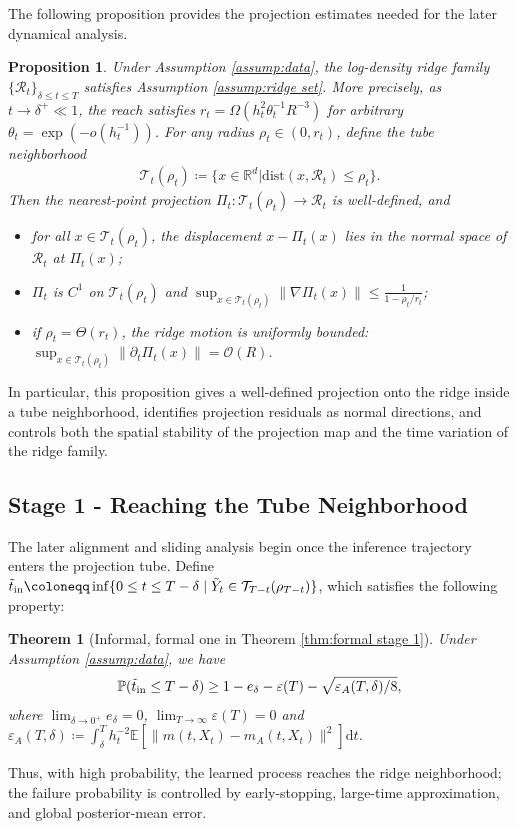 \documentclass[11pt]{article}
\newcommand{\mb}{\mathbb}
\newcommand{\dee}{\mathrm{d}}
\newcommand{\mc}{\mathcal}
\newtheorem{theorem}{Theorem}[section]
\newtheorem{proposition}{Proposition}[section]
\begin{document}
The following proposition provides the projection estimates needed for the later dynamical analysis.
\begin{proposition}\label{prop:projection-regularity} Under Assumption \ref{assump:data}, the log-density ridge family $\{\mc{R}_t\}_{\delta\le t\le T}$ satisfies Assumption \ref{assump:ridge set}. More precisely, as $t\to \delta^+\ll 1$, the reach satisfies $r_t = \Omega(h_t^{2} \theta_t^{-1} R^{-3})$ for arbitrary $\theta_t=\exp(- o(h_{t}^{-1}) )$. For any radius $\rho_t\in (0,r_t)$, define the tube neighborhood
   \begin{align}\label{eq:tube ridge}
    \mc{T}_t(\rho_t)\coloneqq \{ x\in \mb{R}^d | \mathrm{dist}(x, \mc{R}_t)\le \rho_t \}.
\end{align} 
Then the nearest-point projection $\Pi_t: \mc{T}_t(\rho_t)\to \mc{R}_t$ is well-defined, and
\begin{itemize}
    \item [(1)] for all $ x\in \mc{T}_t(\rho_t)$, the displacement $ x-\Pi_t(x)$ lies in the normal space of $\mc{R}_t$ at $\Pi_t(x)$;
    \item [(2)]  $\Pi_t$ is $C^1$ on $\mc{T}_t(\rho_t)$ and $\sup_{x\in \mc{T}_t(\rho_t)} \| \nabla \Pi_t(x) \|\le \tfrac{1}{1-\rho_t/r_t}$;
    \item [(3)] if $\rho_t=\Theta(r_t)$, the ridge motion is uniformly bounded: $\sup_{x\in \mc{T}_t(\rho_t)}\| \partial_t\Pi_t(x)\| = \mc{O}\left( R\right)$.
\end{itemize}
\end{proposition}
In particular, this proposition gives a well-defined projection onto the ridge inside a tube neighborhood, identifies projection residuals as normal directions, and controls both the spatial stability of the projection map and the time variation of the ridge family.
\subsection{Stage 1 - Reaching the Tube Neighborhood}
\label{sec:stage1}
The later alignment and sliding analysis begin once the inference trajectory enters the projection tube. Define $ \Tilde{t}_{\mathrm{in}}  \coloneqq \inf \{ 0\le t\le T-\delta \mid \Tilde{Y}_t\in \mc{T}_{T-t}(\rho_{T-t}) \}$, which satisfies the following property:
\begin{theorem}[Informal, formal one in Theorem \ref{thm:formal stage 1}]\label{thm:informal stage 1} Under Assumption \ref{assump:data}, we have
\begin{align*}
    \mb{P}(\Tilde{t}_{\mathrm{in}}\le T-\delta)\ge 1-e_\delta -\varepsilon(T)-\sqrt{\varepsilon_A(T,\delta)/8},
\end{align*}
where $\lim_{\delta\to 0^+} e_\delta = 0$, $\lim_{T\to\infty}\varepsilon(T)= 0$ and $\varepsilon_A(T,\delta)\coloneqq \int_\delta^T h_t^{-2}\mb{E}[ \| m(t,X_t)-m_A(t,X_t) \|^2 ]\dee t$. 
\end{theorem}
Thus, with high probability, the learned process reaches the ridge neighborhood; the failure probability is controlled by early-stopping, large-time approximation, and global posterior-mean error.
\end{document}
